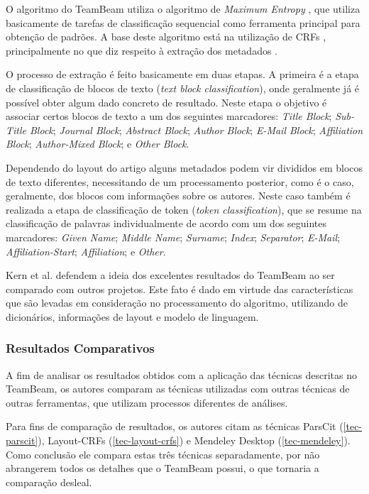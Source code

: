 O algoritmo do TeamBeam utiliza o algoritmo de \textit{Maximum Entropy} \cite{maximum-entropy}, que utiliza basicamente de tarefas de classificação sequencial como ferramenta principal para obtenção de padrões. A base deste algoritmo está na utilização de CRFs \cite{Lafferty-CRF}, principalmente no que diz respeito à extração dos metadados \cite{Peng-CRF-IE}.

O processo de extração é feito basicamente em duas etapas. A primeira é a etapa de classificação de blocos de texto (\textit{text block classification}), onde geralmente já é possível obter algum dado concreto de resultado. Neste etapa o objetivo é associar certos blocos de texto a um dos seguintes marcadores: \textit{Title Block}; \textit{Sub-Title Block}; \textit{Journal Block}; \textit{Abstract Block}; \textit{Author Block}; \textit{E-Mail Block}; \textit{Affiliation Block}; \textit{Author-Mixed Block}; e \textit{Other Block}.

Dependendo do layout do artigo alguns metadados podem vir divididos em blocos de texto diferentes, necessitando de um processamento posterior, como é o caso, geralmente, dos blocos com informações sobre os autores. Neste caso também é realizada a etapa de classificação de token (\textit{token classification}), que se resume na classificação de palavras individualmente de acordo com um dos seguintes marcadores: \textit{Given Name}; \textit{Middle Name}; \textit{Surname}; \textit{Index}; \textit{Separator}; \textit{E-Mail}; \textit{Affiliation-Start}; \textit{Affiliation}; e \textit{Other}.

Kern et al. defendem a ideia dos excelentes resultados do TeamBeam ao ser comparado com outros projetos. Este fato é dado em virtude das características que são levadas em consideração no processamento do algoritmo, utilizando de dicionários, informações de layout e modelo de linguagem.

\subsubsection{Resultados Comparativos}

A fim de analisar os resultados obtidos com a aplicação das técnicas descritas no TeamBeam, os autores comparam as técnicas utilizadas com outras técnicas de outras ferramentas, que utilizam processos diferentes de análises.

Para fins de comparação de resultados, os autores citam as técnicas ParsCit (\autoref{tec-parscit}), Layout-CRFs (\autoref{tec-layout-crfs}) e Mendeley Desktop (\autoref{tec-mendeley}). Como conclusão ele compara estas três técnicas separadamente, por não abrangerem todos os detalhes que o TeamBeam possui, o que tornaria a comparação desleal.

